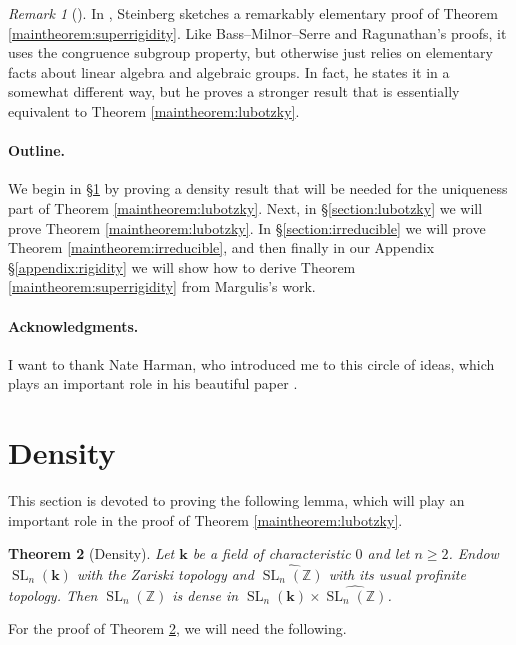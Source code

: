 \documentclass[11pt]{article}
\numberwithin{equation}{section}
\theoremstyle{plain}
\newtheorem{theorem}{Theorem}[section]
\theoremstyle{definition}
\theoremstyle{remark}
\newtheorem{rmk}[theorem]{Remark}
\newenvironment{remark}[1][]{\begin{rmk}[#1] \pushQED{\qed}}{\popQED \end{rmk}}
\DeclareMathOperator{\SL}{SL}
\newcommand\Z{\ensuremath{\mathbb{Z}}}
\newcommand\bk{\ensuremath{\mathbf{k}}}
\newcommand\tSLn{\ensuremath{\widehat{\SL_n(\Z)}}}
\begin{document}
\begin{remark}
In \cite[Theorem 6]{Steinberg}, Steinberg sketches a remarkably elementary proof
of Theorem \ref{maintheorem:superrigidity}.  Like Bass--Milnor--Serre and
Ragunathan's proofs, it uses the congruence subgroup property, but otherwise
just relies on elementary facts about linear algebra and algebraic groups.  In
fact, he states it in a somewhat different way, but he proves a stronger result
that is essentially equivalent to Theorem \ref{maintheorem:lubotzky}.
\end{remark} 

\paragraph{Outline.}
We begin in \S \ref{section:rigidity} by proving a density result that will be needed for the
uniqueness part of Theorem \ref{maintheorem:lubotzky}.  Next, in \S \ref{section:lubotzky} we will
prove Theorem \ref{maintheorem:lubotzky}.  In \S \ref{section:irreducible} we will prove Theorem 
\ref{maintheorem:irreducible}, and then finally in our Appendix \S \ref{appendix:rigidity} we will
show how to derive Theorem \ref{maintheorem:superrigidity} from Margulis's work.

\paragraph{Acknowledgments.}
I want to thank Nate Harman, who introduced me to this circle of ideas, which plays an
important role in his beautiful paper \cite{Harman}.

\section{Density}
\label{section:rigidity}

This section is devoted to proving the following lemma, which will play an important
role in the proof of Theorem \ref{maintheorem:lubotzky}.

\begin{theorem}[Density]
\label{theorem:bigdensity}
Let $\bk$ be a field of characteristic $0$ and let $n \geq 2$.  Endow
$\SL_n(\bk)$ with the Zariski topology and $\tSLn$ with its usual profinite
topology.  Then $\SL_n(\Z)$ is dense in $\SL_n(\bk) \times \tSLn$.
\end{theorem}

For the proof of Theorem \ref{theorem:bigdensity}, we will need the following.
\end{document}
